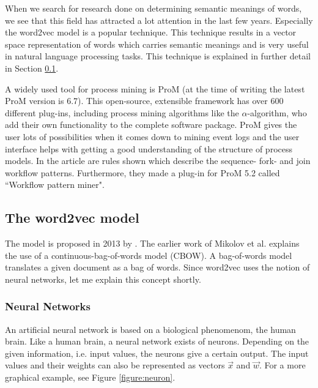 \documentclass[a4paper,11pt]{article}
\begin{document}


When we search for research done on determining semantic meanings of words, we see that this field has attracted a lot attention in the last few years. Especially the word2vec model \cite{Mikolov2013a,Mikolov2013b} is a popular technique. This technique results in a vector space representation of words which carries semantic meanings and is very useful in natural language processing tasks. This technique is explained in further detail in Section \ref{section:word2vec}.

A widely used tool for process mining is ProM \cite{ProM6} (at the time of writing the latest ProM version is 6.7). This open-source, extensible framework has over 600 different plug-ins, including process mining algorithms like the $\alpha$-algorithm, who add their own functionality to the complete software package. ProM gives the user lots of possibilities when it comes down to mining event logs and the user interface helps with getting a good understanding of the structure of process models. In the article \cite{WorkflowMiner2006} are rules shown which describe the sequence- fork- and join workflow patterns. Furthermore, they made a plug-in for ProM 5.2 called ``Workflow pattern miner". 

\subsection{The word2vec model}
\label{section:word2vec}
The model is proposed in 2013 by \cite{Mikolov2013a,Mikolov2013b}. The earlier work of Mikolov et al. \cite{Mikolov2013a} explains the use of a continuous-bag-of-words model (CBOW). A bag-of-words model translates a given document as a bag of words. Since word2vec uses the notion of neural networks, let me explain this concept shortly. 

\subsubsection{Neural Networks}
An artificial neural network is based on a biological phenomenom, the human brain. Like a human brain, a neural network exists of neurons. Depending on the given information, i.e. input values, the neurons give a certain output. The input values and their weights can also be represented as vectors $\vec{x}$ and $\vec{w}$. For a more graphical example, see Figure \ref{figure:neuron}.
\end{document}
